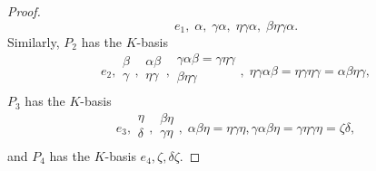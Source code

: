 \documentclass[12pt]{amsart}
\numberwithin{equation}{thm}
\begin{document}
{\begin{proof}
\[
e_1,\; \alpha,\; \gamma\alpha,\; \eta\gamma\alpha,\; \beta\eta\gamma\alpha.
\]
Similarly, $P_2$ has the $K$-basis
\[e_2,
\begin{array}{c}
\beta\\
\gamma\\
\end{array},
\begin{array}{c}
\alpha\beta \\
\eta\gamma \\
\end{array},
\begin{array}{c}
\gamma\alpha\beta=\gamma\eta\gamma\\
\beta\eta\gamma\\
\end{array},\;
\eta\gamma\alpha\beta=\eta\gamma\eta\gamma=\alpha\beta\eta\gamma, \] 
$P_3$ has the $K$-basis
\[e_3,
\begin{array}{c}
\eta\\
\delta\\
\end{array},
\begin{array}{c}
\beta\eta\\
\gamma\eta\\
\end{array},\;
\alpha\beta\eta=\eta\gamma\eta,
\gamma\alpha\beta\eta=\gamma\eta\gamma\eta=\zeta\delta,
\]
and $P_4$ has the $K$-basis $e_4,\zeta,\delta\zeta$.


\end{proof}}
\end{document}

